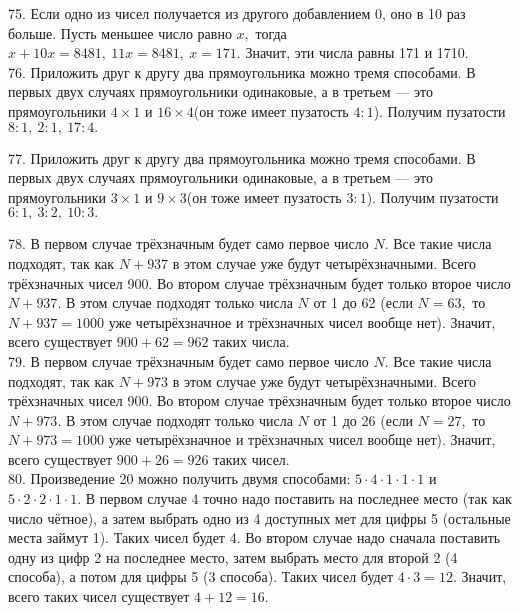 \begin{center}
\begin{figure}[ht!]
\end{figure}
\end{center}
75. Если одно из чисел получается из другого добавлением 0, оно в 10 раз больше. Пусть меньшее число равно $x,$ тогда $x+10x=8481,\ 11x=8481,\ x=171.$ Значит, эти числа равны 171 и 1710.\\
76. Приложить друг к другу два прямоугольника можно тремя способами. В первых двух случаях прямоугольники одинаковые, а в третьем --- это прямоугольники $4\times1$ и $16\times4$(он тоже имеет пузатость $4:1$). Получим пузатости $8:1,\ 2:1,\ 17:4.$
\begin{center}
\begin{figure}[ht!]
\end{figure}
\end{center}
77. Приложить друг к другу два прямоугольника можно тремя способами. В первых двух случаях прямоугольники одинаковые, а в третьем --- это прямоугольники $3\times1$ и $9\times3$(он тоже имеет пузатость $3:1$). Получим пузатости $6:1,\ 3:2,\ 10:3.$
\begin{center}
\begin{figure}[ht!]
\end{figure}
\end{center}
78. В первом случае трёхзначным будет само первое число $N.$ Все такие числа подходят, так как $N+937$ в этом случае уже будут четырёхзначными. Всего трёхзначных чисел 900. Во втором случае трёхзначным будет только второе число $N+937.$ В этом случае подходят только числа $N$ от 1 до 62 (если $N=63,$ то $N+937=1000$ уже четырёхзначное и трёхзначных чисел вообще нет). Значит, всего существует $900+62=962$ таких числа.\\
79. В первом случае трёхзначным будет само первое число $N.$ Все такие числа подходят, так как $N+973$ в этом случае уже будут четырёхзначными. Всего трёхзначных чисел 900. Во втором случае трёхзначным будет только второе число $N+973.$ В этом случае подходят только числа $N$ от 1 до 26 (если $N=27,$ то $N+973=1000$ уже четырёхзначное и трёхзначных чисел вообще нет). Значит, всего существует $900+26=926$ таких чисел.\\
80. Произведение 20 можно получить двумя способами: $5\cdot4\cdot1\cdot1\cdot1$ и $5\cdot2\cdot2\cdot1\cdot1.$ В первом случае 4 точно надо поставить на последнее место (так как число чётное), а затем выбрать одно из 4 доступных мет для цифры 5 (остальные места займут 1). Таких чисел будет 4. Во втором случае надо сначала поставить одну из цифр 2 на последнее место, затем выбрать место для второй 2 (4 способа), а потом для цифры 5 (3 способа). Таких чисел будет $4\cdot3=12.$ Значит, всего таких чисел существует $4+12=16.$\\
